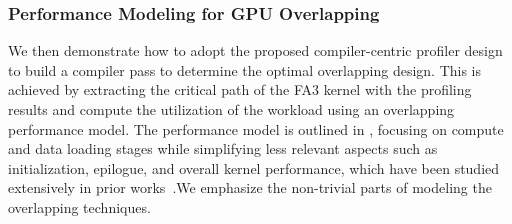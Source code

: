   
  
  \begin{table}[]
    \caption{Performance models}
    \vspace{0.5em}
    \label{tbl:performance_model}
    \end{table}



\subsubsection{Performance Modeling for GPU Overlapping}



We then demonstrate how to adopt the proposed compiler-centric profiler design to build a compiler pass to determine the optimal overlapping design.
This is achieved by extracting the critical path of the FA3 kernel with the profiling results and compute the utilization of the workload using an overlapping performance model. 
The performance model is outlined in \Tbl{\ref{tbl:performance_model}}, focusing on compute and data loading stages while simplifying less relevant aspects such as initialization, epilogue, and overall kernel performance, which have been studied extensively in prior works~\cite{huang_alcop_2023}.We emphasize the non-trivial parts of modeling the overlapping techniques.

